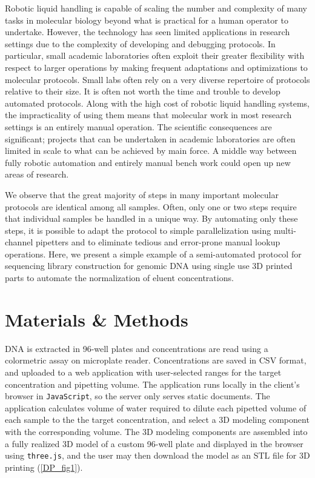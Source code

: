 \begin{refsection}
Robotic liquid handling is capable of scaling the number and complexity of many tasks in molecular biology beyond what is practical for a human operator to undertake. However, the technology has seen limited applications in research settings due to the complexity of developing and debugging protocols. In particular, small academic laboratories often exploit their greater flexibility with respect to larger operations by making frequent adaptations and optimizations to molecular protocols. Small labs often rely on a very diverse repertoire of protocols relative to their size. It is often not worth the time and trouble to develop automated protocols. Along with the high cost of robotic liquid handling systems, the impracticality of using them means that molecular work in most research settings is an entirely manual operation. The scientific consequences are significant; projects that can be undertaken in academic laboratories are often limited in scale to what can be achieved by main force. A middle way between fully robotic automation and entirely manual bench work could open up new areas of research.

We observe that the great majority of steps in many important molecular protocols are identical among all samples. Often, only one or two steps require that individual samples be handled in a unique way. By automating only these steps, it is possible to adapt the protocol to simple parallelization using multi-channel pipetters and to eliminate tedious and error-prone manual lookup operations. Here, we present a simple example of a semi-automated protocol for sequencing library construction for genomic DNA using single use 3D printed parts to automate the normalization of eluent concentrations.

\section{Materials \& Methods}

DNA is extracted in 96-well plates and concentrations are read using a colormetric assay on microplate reader. Concentrations are saved in CSV format, and uploaded to a web application with user-selected ranges for the target concentration and pipetting volume. The application runs locally in the client's browser in {\tt JavaScript}, so the server only serves static documents. The application calculates volume of water required to dilute each pipetted volume of each sample to the the target concentration, and select a 3D modeling component with the corresponding volume. The 3D modeling components are assembled into a fully realized 3D model of a custom 96-well plate and displayed in the browser using {\tt three.js}, \cite{cabello2010three} and the user may then download the model as an STL file for 3D printing (\ref{DP_fig1}). 


\end{refsection}
